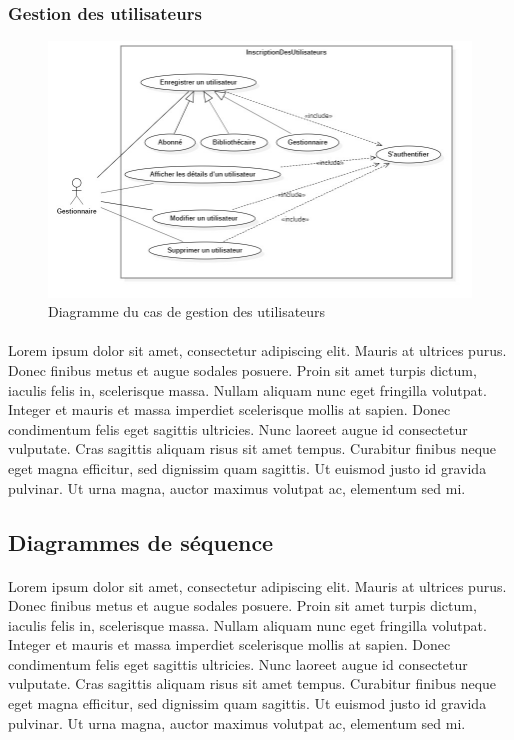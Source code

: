 \subsubsection{Gestion des utilisateurs} 
\begin{figure}[h]
        \centering
        \includegraphics[width=1\textwidth]{gestionDesUtilisateursUseCase}
        \caption{Diagramme du cas de gestion des utilisateurs}
        \label{image-gestionDesUtilisateursUseCase}
        \end{figure}
\paragraph{}
Lorem ipsum dolor sit amet, consectetur adipiscing elit. Mauris at ultrices purus. Donec finibus metus et augue sodales posuere. Proin sit amet turpis dictum, iaculis felis in, scelerisque massa. Nullam aliquam nunc eget fringilla volutpat. Integer et mauris et massa imperdiet scelerisque mollis at sapien. Donec condimentum felis eget sagittis ultricies. Nunc laoreet augue id consectetur vulputate. Cras sagittis aliquam risus sit amet tempus. Curabitur finibus neque eget magna efficitur, sed dignissim quam sagittis. Ut euismod justo id gravida pulvinar. Ut urna magna, auctor maximus volutpat ac, elementum sed mi.



\subsection{Diagrammes de séquence}
\paragraph{} 
Lorem ipsum dolor sit amet, consectetur adipiscing elit. Mauris at ultrices purus. Donec finibus metus et augue sodales posuere. Proin sit amet turpis dictum, iaculis felis in, scelerisque massa. Nullam aliquam nunc eget fringilla volutpat. Integer et mauris et massa imperdiet scelerisque mollis at sapien. Donec condimentum felis eget sagittis ultricies. Nunc laoreet augue id consectetur vulputate. Cras sagittis aliquam risus sit amet tempus. Curabitur finibus neque eget magna efficitur, sed dignissim quam sagittis. Ut euismod justo id gravida pulvinar. Ut urna magna, auctor maximus volutpat ac, elementum sed mi.
